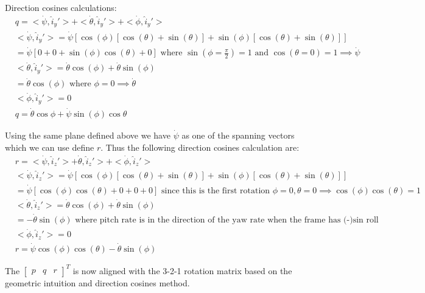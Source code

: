 \documentclass{article}
\begin{document}
Direction cosines calculations:
\begin{align*}
    & q = <\dot{\psi}, \hat{i}_y'> + <\dot{\theta}, \hat{i}_y'> + <\dot{\phi}, \hat{i}_y'> \\
    & <\dot{\psi}, \hat{i}_y'> = \dot{\psi}[\cos(\phi)[\cos(\theta) + \sin(\theta)] + \sin(\phi)[\cos(\theta) + \sin(\theta)]] \\
    & = \dot{\psi}[0 + 0 + \sin(\phi)\cos(\theta) + 0] \text{ where } \sin(\phi = \frac{\pi}{2}) = 1 \text{ and } \cos(\theta = 0) = 1 \implies \dot{\psi} \\
    & <\dot{\theta}, \hat{i}_y'> = \dot{\theta} \cos(\phi) + \dot{\theta} \sin(\phi) \\
    & = \dot{\theta} \cos(\phi) \text{ where } \phi = 0 \implies \dot{\theta} \\
    & <\dot{\phi}, \hat{i}_y'> = 0 \\
    & q = \dot{\theta} \cos{\phi} + \dot{\psi} \sin(\phi)\cos{\theta}
\end{align*}

Using the same plane defined above we have $\dot{\psi}$ as one of the spanning vectors which we can use define $r$. Thus the following direction cosines calculation are:
\begin{align*}
    & r = <\dot{\psi}, \hat{i}_z'> + \dot{\theta}, \hat{i}_z'> + <\dot{\phi}, \hat{i}_z'> \\
    & <\dot{\psi}, \hat{i}_z'> = \dot{\psi}[\cos(\phi)[\cos(\theta) + \sin(\theta)] + \sin(\phi)[\cos(\theta) + \sin(\theta)]] \\
    & = \dot{\psi}[\cos(\phi) \cos(\theta) + 0 + 0 + 0] \text{ since this is the first rotation } \phi = 0, \theta = 0 \implies \cos(\phi) \cos(\theta) = 1 \\
    & <\dot{\theta}, \hat{i}_z'> = \dot{\theta} \cos(\phi) + \dot{\theta} \sin(\phi) \\
    & = - \dot{\theta} \sin(\phi) \text{ where pitch rate is in the direction of the yaw rate when the frame has (-)sin roll component } \\
    & <\dot{\phi}, \hat{i}_z'> = 0 \\
    & r = \dot{\psi} \cos(\phi) \cos(\theta) - \dot{\theta} \sin(\phi)
\end{align*}

The $\begin{bmatrix} p & q & r\end{bmatrix}^T$ is now aligned with the 3-2-1 rotation matrix based on the geometric intuition and direction cosines method.
\end{document}

